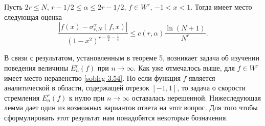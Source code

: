 
\begin{corollary} Пусть $2r\le N$, $r-1/2\le \alpha\le 2r-1/2$, $f\in W^r$, $-1<x<1$. Тогда имеет место следующая оценка
\begin{equation}\label{sobleg-5.31}
 \frac{|f(x)-\sigma_{r,N}^\alpha(f,x)|}
{(1-x^2)^{r-\frac{\alpha}{2}-\frac14}}\le c(r,\alpha)\frac{\ln(N+1)}{N^r}.
 \end{equation}
\end{corollary}


В связи с результатом, установленным в теореме 5, возникает задача об изучении поведения величины $E_{n}^r(f)$ при $n\to\infty$. Как уже отмечалось выше, для $f\in W^r$ имеет место неравенство \eqref{sobleg-3.54}. Но если функция $f$ является аналитической в области, содержащей отрезок $[-1,1]$, то задача о скорости стремления $E_{n}^r(f)$ к нулю при $n\to\infty$ оставалась нерешенной. Нижеследующая лемма дает один из возможных вариантов ответа на этот вопрос. Для того чтобы сформулировать этот результат нам понадобятся некоторые бозначения.

